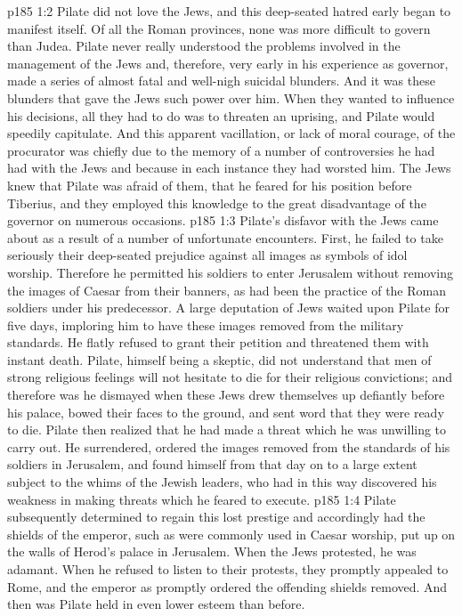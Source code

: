 \vs p185 1:2 Pilate did not love the Jews, and this deep\hyp{}seated hatred early began to manifest itself. Of all the Roman provinces, none was more difficult to govern than Judea. Pilate never really understood the problems involved in the management of the Jews and, therefore, very early in his experience as governor, made a series of almost fatal and well\hyp{}nigh suicidal blunders. And it was these blunders that gave the Jews such power over him. When they wanted to influence his decisions, all they had to do was to threaten an uprising, and Pilate would speedily capitulate. And this apparent vacillation, or lack of moral courage, of the procurator was chiefly due to the memory of a number of controversies he had had with the Jews and because in each instance they had worsted him. The Jews knew that Pilate was afraid of them, that he feared for his position before Tiberius, and they employed this knowledge to the great disadvantage of the governor on numerous occasions.\plusone
\vs p185 1:3 Pilate’s disfavor with the Jews came about as a result of a number of unfortunate encounters. First, he failed to take seriously their deep\hyp{}seated prejudice against all images as symbols of idol worship. Therefore he permitted his soldiers to enter Jerusalem without removing the images of Caesar from their banners, as had been the practice of the Roman soldiers under his predecessor. A large deputation of Jews waited upon Pilate for five days, imploring him to have these images removed from the military standards. He flatly refused to grant their petition and threatened them with instant death. Pilate, himself being a skeptic, did not understand that men of strong religious feelings will not hesitate to die for their religious convictions; and therefore was he dismayed when these Jews drew themselves up defiantly before his palace, bowed their faces to the ground, and sent word that they were ready to die. Pilate then realized that he had made a threat which he was unwilling to carry out. He surrendered, ordered the images removed from the standards of his soldiers in Jerusalem, and found himself from that day on to a large extent subject to the whims of the Jewish leaders, who had in this way discovered his weakness in making threats which he feared to execute.
\vs p185 1:4 Pilate subsequently determined to regain this lost prestige and accordingly had the shields of the emperor, such as were commonly used in Caesar worship, put up on the walls of Herod’s palace in Jerusalem. When the Jews protested, he was adamant. When he refused to listen to their protests, they promptly appealed to Rome, and the emperor as promptly ordered the offending shields removed. And then was Pilate held in even lower esteem than before.
